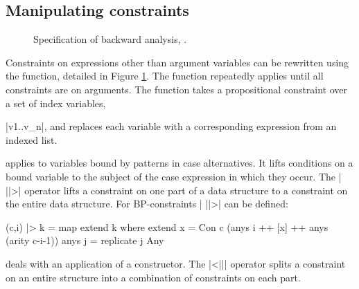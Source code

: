 \subsection{Manipulating constraints}
\label{sec:backward}

\begin{figure}
\caption{Specification of backward analysis, .}
\label{fig:backward}
\figureend
\end{figure}

Constraints on expressions other than argument variables can be rewritten using the  function, detailed in Figure \ref{fig:backward}. The  function repeatedly applies  until all constraints are on arguments. The  function takes a propositional constraint over a set of index variables, \ignore|v1..v_n|, and replaces each variable with a corresponding expression from an indexed list.

 applies to variables bound by patterns in case alternatives. It lifts conditions on a bound variable to the subject of the case expression in which they occur. The | ||>| operator lifts a constraint on one part of a data structure to a constraint on the entire data structure. For BP-constraints | ||>| can be defined:

\begin{code}
(c,i) |> k = map extend k
    where
    extend x = Con c (anys i ++ [x] ++ anys (arity c-i-1))
    anys j = replicate j Any
\end{code}

 deals with an application of a constructor. The |<||| operator splits a constraint on an entire structure into a combination of constraints on each part.

